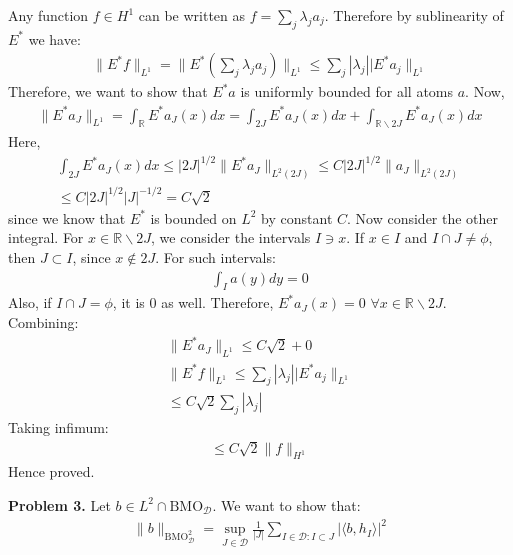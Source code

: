 \documentclass{article}
\newcommand{\R}{\mathbb{R}}
\newcommand{\D}{\mathcal{D}}
\newcommand{\bmo}{\text{BMO}}
\begin{document}
Any function $f \in H^1$ can be written as $f = \sum_j \lambda_j a_j$. Therefore by sublinearity of $E^*$ we have:
\begin{gather*}
    \lVert E^*f\rVert_{L^1} = \lVert E^* \left( \sum_j \lambda_j a_j \right)\rVert_{L^1} \leq \sum_j |\lambda_j| \lvert E^* a_j \rVert_{L^1}
\end{gather*}
Therefore, we want to show that $E^* a$ is uniformly bounded for all atoms $a$. Now,
\begin{gather*}
    \lVert E^* a_J \rVert_{L^1} = \int_{\R} E^*a_J(x)dx = \int_{2J} E^*a_J(x)dx + \int_{\R \backslash 2J} E^*a_J(x)dx
\end{gather*}
Here,
\begin{gather*}
   \int_{2J} E^*a_J(x)dx \leq |2J|^{1/2} \lVert E^* a_J \rVert_{L^2 (2J)} \leq C |2J|^{1/2} \lVert a_J \rVert_{L^2 (2J)} \\
   \leq C |2J|^{1/2} |J|^{-1/2} = C \sqrt{2}
\end{gather*}
since we know that $E^*$ is bounded on $L^2$ by constant $C$. Now consider the other integral. For $x \in \R \backslash 2J$, we consider the intervals $I \ni x$. If $x \in I$ and $I \cap J \neq \phi$, then $J \subset I$, since $x \notin 2J$. For such intervals:
\begin{gather*}
    \int_I a(y)dy = 0
\end{gather*}
Also, if $ I \cap J = \phi$, it is 0 as well. Therefore, $E^*a_J(x) = 0$ $\forall x \in \R \backslash 2J$. Combining:
\begin{gather*}
    \lVert E^* a_J \rVert_{L^1} \leq C \sqrt{2} + 0 \\
    \lVert E^*f\rVert_{L^1} \leq \sum_j |\lambda_j| \lvert E^* a_j \rVert_{L^1}\\
    \leq C \sqrt{2} \sum_j |\lambda_j|
\end{gather*}
Taking infimum:
\begin{gather*}
    \leq C \sqrt{2} \lVert f \rVert_{H^1}
\end{gather*}
Hence proved.
\clearpage


\textbf{Problem 3. } Let $b \in L^2 \cap \bmo_{\D}$. We want to show that:
\begin{gather*}
    \lVert b \rVert_{\bmo_{\D}^2} = \sup_{J \in \D} \frac{1}{|J|} \sum_{I \in \D: I \subset J} |\langle b, h_I \rangle|^2
\end{gather*}
\end{document}
